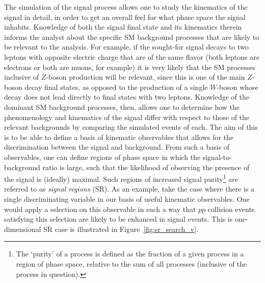 The simulation of the signal process allows one to study the kinematics of the signal in detail, in order
to get an overall feel for what phase space the signal inhabits.
Knowledge of both the signal final state and its kinematics therein informs the analyst
about the specific SM background processes that are likely to be relevant to the analysis.
For example, if the sought-for signal decays to two leptons with opposite electric charge
that are of the same flavor (both leptons are electrons or both are muons, for example)
it is very likely that the SM processes inclusive of $Z$-boson production will be relevant,
since this is one of the main $Z$-boson decay final states, as opposed to the production of a single $W$-boson
whose decay does not lead directly to final states with two leptons.
Knowledge of the dominant SM background processes, then, allows
one to determine how the phenomenology and kinematics of the signal differ
with respect to those of the relevant backgrounds by comparing the simulated events
of each.
The aim of this is to be able to define a basis of kinematic observables that allows
for the discrimination between the signal and background.
From such a basis of observables, one can define regions of phase space in which
the signal-to-background ratio is large, such that the likelihood of observing
the presence of the signal is (ideally) maximal.
Such regions of increased signal purity\footnote{The `purity' of a process is defined
as the fraction of a given process in a region of phase space, relative to the sum
of all processes (inclusive of the process in question).} are referred
to as \textit{signal regions} (SR).
As an example, take the case where there is a single discriminating variable in our
basis of useful kinematic observables.
One would apply a selection on this observable in such a way that $pp$ collision events
satisfying this selection are likely to be enhanced in signal events.
This is one-dimensional SR case is illustrated in Figure~\ref{fig:sr_search_v}.

